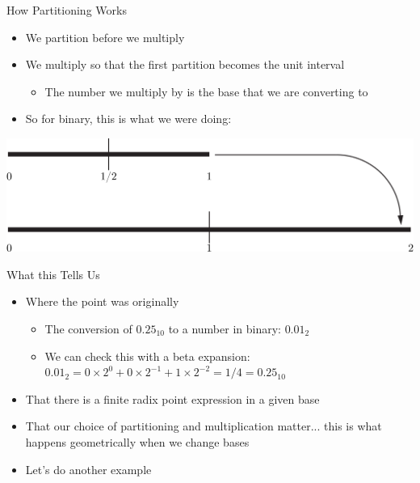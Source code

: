 \documentclass{beamer}
\begin{document}
\begin{frame}{How Partitioning Works}
  \begin{itemize}
    \item We partition before we multiply \pause
    \item We multiply so that the first partition becomes the unit interval \pause
    \begin{itemize}
      \item The number we multiply by is the base that we are converting to \pause
    \end{itemize}
    \item So for binary, this is what we were doing:
  \end{itemize}
  \includegraphics[width=\textwidth]{images/partitioning/partitioning}
\end{frame}

\begin{frame}{What this Tells Us}
  \begin{itemize}
    \item Where the point was originally \pause
    \begin{itemize}
      \item The conversion of $0.25_{10}$ to a number in binary: $0.01_2$
      \item We can check this with a beta expansion: $0.01_2 = 0\times2^{0} + 0\times2^{-1} + 1\times2^{-2} = 1/4 = 0.25_{10}$
    \end{itemize} \pause
  \item That there is a finite radix point expression in a given base \pause
  \item That our choice of partitioning and multiplication matter... this is what happens geometrically when we change bases \pause
  \item Let's do another example
  \end{itemize}
\end{frame}
\end{document}
